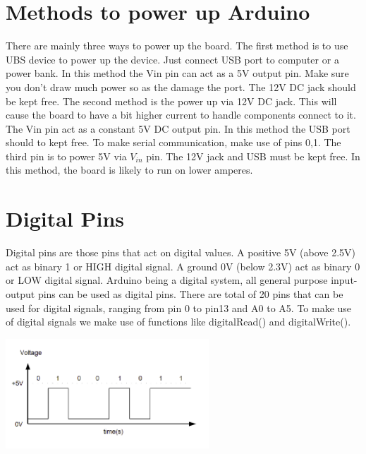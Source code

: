 \section{Methods to power up Arduino}
\par There are mainly three ways to power up the board. The first method is to use UBS device to power up the device. Just connect USB port to computer or a power bank. In this method the Vin pin can act as a 5V output pin. Make sure you don’t draw much power so as the damage the port. The 12V DC jack should be kept free. The second method is the power up via 12V DC jack. This will cause the board to have a bit higher current to handle components connect to it. The Vin pin act as a constant 5V DC output pin. In this method the USB port should to kept free. To make serial communication, make use of pins 0,1. The third pin is to power 5V via $V_{in}$ pin. The 12V jack and USB must be kept free. In this method, the board is likely to run on lower amperes.
\section{Digital Pins}
\par Digital pins are those pins that act on digital values. A positive 5V (above 2.5V) act as binary 1 or HIGH digital signal. A ground 0V (below 2.3V) act as binary 0 or LOW digital signal. Arduino being a digital system, all general purpose input-output pins can be used as digital pins. There are total of 20 pins that can be used for digital signals, ranging from pin 0 to pin13 and A0 to A5. To make use of digital signals we make use of functions like digitalRead() and digitalWrite().
\begin{marginfigure}
 \vspace{-1.3in}
 \includegraphics[width=3in]{Chapters/images/graph.png}
\end{marginfigure}

